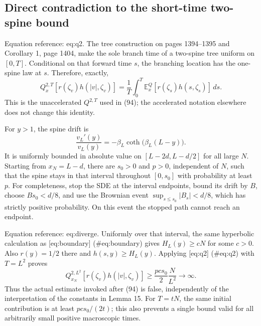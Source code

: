 \documentclass[10pt]{article}
\begin{document}
\subsection*{Direct contradiction to the short-time two-spine bound}
Equation reference: eq:q2. The tree construction on pages 1394–1395 and Corollary 1, page 1404, make the sole branch time of a two-spine tree uniform on \([0,T]\). Conditional on that forward time \(s\), the branching location has the one-spine law at \(s\). Therefore, exactly, \[
 Q_x^{2,T}[r(\zeta_v)h(|v|,\zeta_v)]
 =\frac1T\int_0^T
       \mathbb E_x^Q[r(\zeta_s)h(s,\zeta_s)]\,ds .\] This is the unaccelerated \(Q^{2,T}\) used in (94); the accelerated notation elsewhere does not change this identity.\par
For \(y>1\), the spine drift is \[\frac{v_L'(y)}{v_L(y)}
   =-\beta_L\coth\big(\beta_L(L-y)\big).\] It is uniformly bounded in absolute value on \([L-2d,L-d/2]\) for all large \(N\). Starting from \(x_N=L-d\), there are \(s_0>0\) and \(p>0\), independent of \(N\), such that the spine stays in that interval throughout \([0,s_0]\) with probability at least \(p\). For completeness, stop the SDE at the interval endpoints, bound its drift by \(B\), choose \(Bs_0<d/8\), and use the Brownian event \(\sup_{s\leq s_0}|B_s|<d/8\), which has strictly positive probability. On this event the stopped path cannot reach an endpoint.\par
Equation reference: eq:diverge. Uniformly over that interval, the same hyperbolic calculation as [eq:boundary] (\#eq:boundary) gives \(H_L(y)\geq cN\) for some \(c>0\). Also \(r(y)=1/2\) there and \(h(s,y)\geq H_L(y)\). Applying [eq:q2] (\#eq:q2) with \(T=L^2\) proves \[
 Q_{x_N}^{2,L^2}[r(\zeta_v)h(|v|,\zeta_v)]
 \geq \frac{pcs_0}{2}\frac{N}{L^2}
 \longrightarrow\infty .\] Thus the actual estimate invoked after (94) is false, independently of the interpretation of the constants in Lemma 15. For \(T=tN\), the same initial contribution is at least \(pcs_0/(2t)\); this also prevents a single bound valid for all arbitrarily small positive macroscopic times.\par
\end{document}
